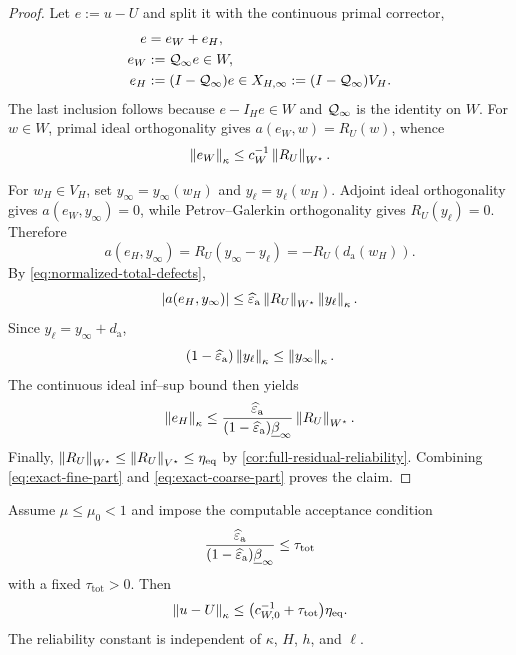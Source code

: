 \begin{proof}
Let $e:=u-U$ and split it with the continuous primal corrector,
\begin{align*}
  e&=e_W+e_H,
  \\
  e_W&:=\mathcal Q_\infty e\in W,
  \\
  e_H&:=(I-\mathcal Q_\infty)e\in X_{H,\infty}:=(I-\mathcal Q_\infty)V_H.
\end{align*}
The last inclusion follows because $e-I_He\in W$ and $\mathcal Q_\infty$ is the
identity on $W$.  For $w\in W$, primal ideal orthogonality gives
$a(e_W,w)=R_U(w)$, whence
\begin{equation}
\label{eq:exact-fine-part}
  \left\lVert e_W\right\rVert_\kappa
  \leq c_W^{-1}\left\lVert R_U\right\rVert_{W^\star}.
\end{equation}

For $w_H\in V_H$, set $y_\infty=y_\infty(w_H)$ and
$y_\ell=y_\ell(w_H)$.  Adjoint ideal orthogonality gives
$a(e_W,y_\infty)=0$, while Petrov--Galerkin orthogonality gives
$R_U(y_\ell)=0$.  Therefore
\[
  a(e_H,y_\infty)
  =R_U(y_\infty-y_\ell)
  =-R_U(d_{\mathrm a}(w_H)).
\]
By \eqref{eq:normalized-total-defects},
\[
  |a(e_H,y_\infty)|
  \leq\widehat\varepsilon_{\mathrm a}\left\lVert R_U\right\rVert_{W^\star}\left\lVert y_\ell\right\rVert_\kappa.
\]
Since $y_\ell=y_\infty+d_{\mathrm a}$,
\[
  (1-\widehat\varepsilon_{\mathrm a})\left\lVert y_\ell\right\rVert_\kappa
  \leq\left\lVert y_\infty\right\rVert_\kappa.
\]
The continuous ideal inf--sup bound then yields
\begin{equation}
\label{eq:exact-coarse-part}
  \left\lVert e_H\right\rVert_\kappa
  \leq
  \frac{\widehat\varepsilon_{\mathrm a}}{(1-\widehat\varepsilon_{\mathrm a})\underline\beta_\infty}
  \left\lVert R_U\right\rVert_{W^\star}.
\end{equation}
Finally,
$\left\lVert R_U\right\rVert_{W^\star}\leq\left\lVert R_U\right\rVert_{V^\star}\leq\eta_{\mathrm{eq}}$ by
\cref{cor:full-residual-reliability}.  Combining
\eqref{eq:exact-fine-part} and \eqref{eq:exact-coarse-part} proves the
claim.
\end{proof}

\begin{corollary}
\label{cor:k-robust-reliability}
Assume $\mu\leq\mu_0<1$ and impose the computable acceptance condition
\begin{equation}
\label{eq:k-robust-acceptance}
  \frac{\widehat\varepsilon_{\mathrm a}}{(1-\widehat\varepsilon_{\mathrm a})\underline\beta_\infty}
  \leq\tau_{\mathrm{tot}}
\end{equation}
with a fixed $\tau_{\mathrm{tot}}>0$.  Then
\begin{equation}
\label{eq:k-robust-bound}
  \left\lVert u-U\right\rVert_\kappa
  \leq
  \bigl(c_{W,0}^{-1}+\tau_{\mathrm{tot}}\bigr)\eta_{\mathrm{eq}}.
\end{equation}
The reliability constant is independent of $\kappa$, $H$, $h$, and
$\ell$.
\end{corollary}

